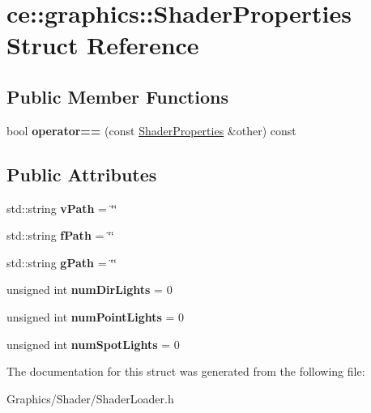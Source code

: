 \hypertarget{structce_1_1graphics_1_1_shader_properties}{}\section{ce\+:\+:graphics\+:\+:Shader\+Properties Struct Reference}
\label{structce_1_1graphics_1_1_shader_properties}
\subsection*{Public Member Functions}
\begin{DoxyCompactItemize}
\item 
\mbox{\label{structce_1_1graphics_1_1_shader_properties_a36dd41572daba1bed598dee9fbc24cdb}} 
bool {\bfseries operator==} (const \hyperlink{structce_1_1graphics_1_1_shader_properties}{Shader\+Properties} \&other) const
\end{DoxyCompactItemize}
\subsection*{Public Attributes}
\begin{DoxyCompactItemize}
\item 
\mbox{\label{structce_1_1graphics_1_1_shader_properties_a7c292a15c7a6d732c23a859448fadef9}} 
std\+::string {\bfseries v\+Path} = \char`\"{}\char`\"{}
\item 
\mbox{\label{structce_1_1graphics_1_1_shader_properties_a38bb1cbff534647f4e2317e6b00ff14f}} 
std\+::string {\bfseries f\+Path} = \char`\"{}\char`\"{}
\item 
\mbox{\label{structce_1_1graphics_1_1_shader_properties_af1c3a63df0b9520a9cbb00022a5cf32a}} 
std\+::string {\bfseries g\+Path} = \char`\"{}\char`\"{}
\item 
\mbox{\label{structce_1_1graphics_1_1_shader_properties_a7d54a6b908a22b03048b931c68bb1b73}} 
unsigned int {\bfseries num\+Dir\+Lights} = 0
\item 
\mbox{\label{structce_1_1graphics_1_1_shader_properties_a67afcd1acec57748e14ed1ee9705f2bf}} 
unsigned int {\bfseries num\+Point\+Lights} = 0
\item 
\mbox{\label{structce_1_1graphics_1_1_shader_properties_a2345e569f945babf05778559f639eac4}} 
unsigned int {\bfseries num\+Spot\+Lights} = 0
\end{DoxyCompactItemize}


The documentation for this struct was generated from the following file\+:\begin{DoxyCompactItemize}
\item 
Graphics/\+Shader/Shader\+Loader.\+h\end{DoxyCompactItemize}
